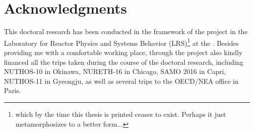 \chapter*{Acknowledgments}

This doctoral research has been conducted in the framework of the  project in the Laboratory for Reactor Physics and Systems Behavior (LRS)\footnote{which by the time this thesis is printed ceases to exist. Perhaps it just metamorphosizes to a better form...} at the .
Besides providing me with a comfortable working place,  through the  project also kindly financed all the trips taken during the course of the doctoral research, including NUTHOS-10 in Okinawa, NURETH-16 in Chicago, SAMO 2016 in Capri, NUTHOS-11 in Gyeongju, as well as several trips to the OECD/NEA office in Paris.

